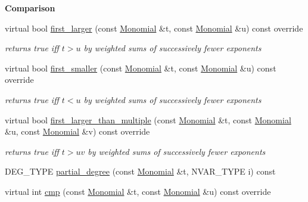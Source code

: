 \begin{Indent}\textbf{ Comparison}\par
\begin{DoxyCompactItemize}
\item 
\mbox{\label{group__orderinggroup_a547c267540f69917cadbeba621642f2a}} 
virtual bool \hyperlink{group__orderinggroup_a547c267540f69917cadbeba621642f2a}{first\+\_\+larger} (const \hyperlink{group__polygroup_class_monomial}{Monomial} \&t, const \hyperlink{group__polygroup_class_monomial}{Monomial} \&u) const override
\begin{DoxyCompactList}\small\item\em returns {\ttfamily true} iff $t>u$ by weighted sums of successively fewer exponents \end{DoxyCompactList}\item 
\mbox{\label{group__orderinggroup_a0e4327be4c18de7180ba2cd8c2f9d549}} 
virtual bool \hyperlink{group__orderinggroup_a0e4327be4c18de7180ba2cd8c2f9d549}{first\+\_\+smaller} (const \hyperlink{group__polygroup_class_monomial}{Monomial} \&t, const \hyperlink{group__polygroup_class_monomial}{Monomial} \&u) const override
\begin{DoxyCompactList}\small\item\em returns {\ttfamily true} iff $t< u$ by weighted sums of successively fewer exponents \end{DoxyCompactList}\item 
\mbox{\label{group__orderinggroup_a89e34bbf5098cc47d86468fcc334b670}} 
virtual bool \hyperlink{group__orderinggroup_a89e34bbf5098cc47d86468fcc334b670}{first\+\_\+larger\+\_\+than\+\_\+multiple} (const \hyperlink{group__polygroup_class_monomial}{Monomial} \&t, const \hyperlink{group__polygroup_class_monomial}{Monomial} \&u, const \hyperlink{group__polygroup_class_monomial}{Monomial} \&v) const override
\begin{DoxyCompactList}\small\item\em returns {\ttfamily true} iff $t>uv$ by weighted sums of successively fewer exponents \end{DoxyCompactList}\item 
D\+E\+G\+\_\+\+T\+Y\+PE \hyperlink{group__orderinggroup_ad7e630709c14774bac365c46b9455bab}{partial\+\_\+degree} (const \hyperlink{group__polygroup_class_monomial}{Monomial} \&t, N\+V\+A\+R\+\_\+\+T\+Y\+PE i) const
\item 
virtual int \hyperlink{group__orderinggroup_a0a65b26c9057d7f9d8c29ca3896cfd74}{cmp} (const \hyperlink{group__polygroup_class_monomial}{Monomial} \&t, const \hyperlink{group__polygroup_class_monomial}{Monomial} \&u) const override
\end{DoxyCompactItemize}
\end{Indent}

